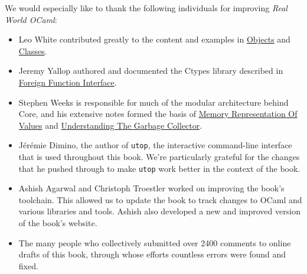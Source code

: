 We would especially like to thank the following individuals for
improving \emph{Real World OCaml}:

\begin{itemize}
\item
  Leo White contributed greatly to the content and examples in
  \href{objects.html\#objects}{Objects} and
  \href{classes.html\#classes}{Classes}.
\item
  Jeremy Yallop authored and documented the Ctypes library described in
  \href{foreign-function-interface.html\#foreign-function-interface}{Foreign
  Function Interface}.
\item
  Stephen Weeks is responsible for much of the modular architecture
  behind Core, and his extensive notes formed the basis of
  \href{runtime-memory-layout.html\#memory-representation-of-values}{Memory
  Representation Of Values} and
  \href{garbage-collector.html\#understanding-the-garbage-collector}{Understanding
  The Garbage Collector}.
\item
  Jérémie Dimino, the author of \passthrough{\lstinline!utop!}, the
  interactive command-line interface that is used throughout this book.
  We're particularly grateful for the changes that he pushed through to
  make \passthrough{\lstinline!utop!} work better in the context of the
  book.
\item
  Ashish Agarwal and Christoph Troestler worked on improving the book's
  toolchain. This allowed us to update the book to track changes to
  OCaml and various libraries and tools. Ashish also developed a new and
  improved version of the book's website.
\item
  The many people who collectively submitted over 2400 comments to
  online drafts of this book, through whose efforts countless errors
  were found and fixed.
\end{itemize}
